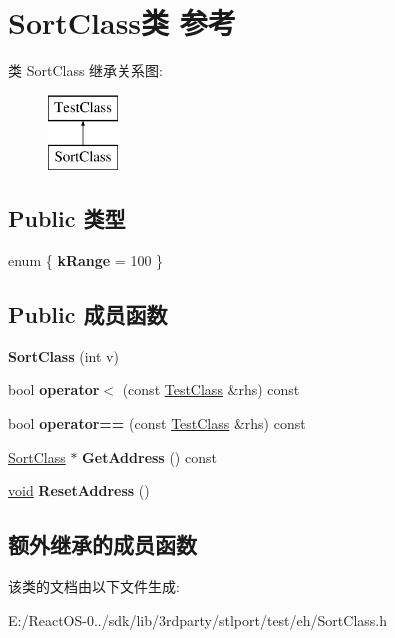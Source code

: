 \hypertarget{class_sort_class}{}\section{Sort\+Class类 参考}
\label{class_sort_class}
类 Sort\+Class 继承关系图\+:\begin{figure}[H]
\begin{center}
\leavevmode
\includegraphics[height=2.000000cm]{class_sort_class}
\end{center}
\end{figure}
\subsection*{Public 类型}
\begin{DoxyCompactItemize}
\item 
\mbox{\label{class_sort_class_a4e186a1418d99f3b65e372612c4a7563}} 
enum \{ {\bfseries k\+Range} = 100
 \}
\end{DoxyCompactItemize}
\subsection*{Public 成员函数}
\begin{DoxyCompactItemize}
\item 
\mbox{\label{class_sort_class_a66e2e3dae1722b62946602444b4c4f56}} 
{\bfseries Sort\+Class} (int v)
\item 
\mbox{\label{class_sort_class_a16aa6183c61ae628ffd143a50268fc1f}} 
bool {\bfseries operator$<$} (const \hyperlink{class_test_class}{Test\+Class} \&rhs) const
\item 
\mbox{\label{class_sort_class_a0575db37cf80df45ce41b10b1f7ce456}} 
bool {\bfseries operator==} (const \hyperlink{class_test_class}{Test\+Class} \&rhs) const
\item 
\mbox{\label{class_sort_class_a68e11f19802b6fe3348497983dfa4a83}} 
\hyperlink{class_sort_class}{Sort\+Class} $\ast$ {\bfseries Get\+Address} () const
\item 
\mbox{\label{class_sort_class_a000a3f72b65bf4b9876dfffce1eb0672}} 
\hyperlink{interfacevoid}{void} {\bfseries Reset\+Address} ()
\end{DoxyCompactItemize}
\subsection*{额外继承的成员函数}


该类的文档由以下文件生成\+:\begin{DoxyCompactItemize}
\item 
E\+:/\+React\+O\+S-\/0../sdk/lib/3rdparty/stlport/test/eh/Sort\+Class.\+h\end{DoxyCompactItemize}
